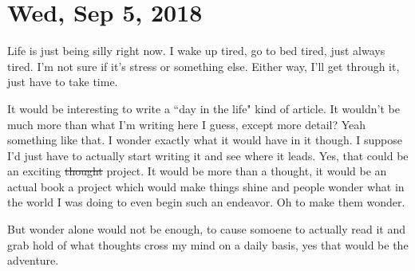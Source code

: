\section{Wed, Sep 5, 2018}

Life is just being silly right now. I wake up tired, go to bed tired, just always
tired. I'm not sure if it's stress or something else. Either way, I'll get through
it, just have to take time.

It would be interesting to write a ``day in the life" kind of article. It wouldn't be
much more than what I'm writing here I guess, except more detail? Yeah something like
that. I wonder exactly what it would have in it though. I suppose I'd just have to
actually start writing it and see where it leads. Yes, that could be an exciting
\st{thought} project. It would be more than a thought, it would be an actual book a
project which would make things shine and people wonder what in the world I was doing
to even begin such an endeavor. Oh to make them wonder.

But wonder alone would not be enough, to cause somoene to actually read it and grab
hold of what thoughts cross my  mind on a daily basis, yes that would be the
adventure.